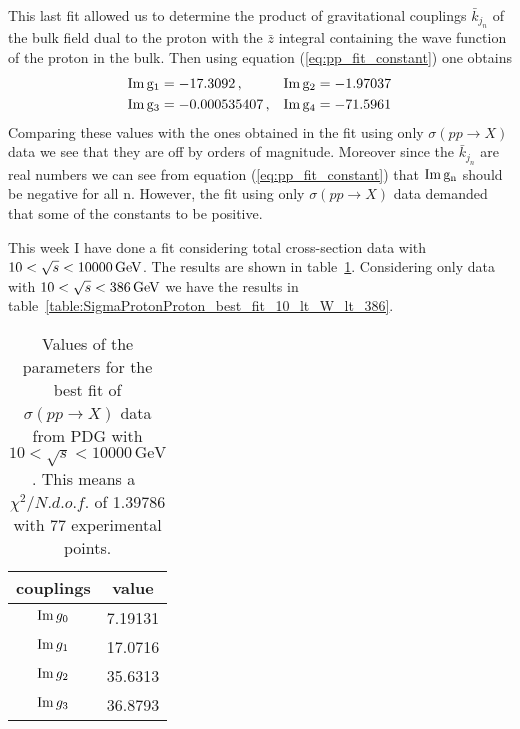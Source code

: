 \documentclass[preprint, 12pt]{elsarticle}
\begin{document}
This last fit allowed us to determine the product of gravitational couplings $\bar{k}_{j_n}$ of the bulk field dual to the proton with the $\bar{z}$ integral containing the wave function of the proton in the bulk. Then using equation (\ref{eq:pp_fit_constant}) one obtains
\begin{align}
& {\rm Im \, g_1} = -17.3092 \, , & {\rm Im \, g_2} = -1.97037 \notag \\
& {\rm Im \, g_3} = -0.000535407 \, , & {\rm Im \, g_4} =	-71.5961
\end{align}
Comparing these values with the ones obtained in the fit using only $\sigma\left(p p \rightarrow X\right)$ data we see that they are off by orders of magnitude. Moreover since the $\bar{k}_{j_n}$ are real numbers we can see from equation (\ref{eq:pp_fit_constant}) that ${\rm Im \, g_n}$ should be negative for all n. However, the fit using only $\sigma\left(p p \rightarrow X\right)$ data demanded that some of the constants to be positive.

This week I have done a fit considering total cross-section data with $10 < \sqrt{s} < 10000 \, \rm{GeV}$. The results are shown in table~\ref{table:SigmaProtonProton_best_fit_10_lt_W_lt_10000}. Considering only data with $10 < \sqrt{s} < 386 \, \rm{GeV}$ we have the results in table~\ref{table:SigmaProtonProton_best_fit_10_lt_W_lt_386}.
\begin{table}[b!]
\centering
\caption{Values of the parameters for the best fit of  $\sigma\left(p p \rightarrow X\right)$ data from PDG with $10 < \sqrt{s} < 10000 \, \text{GeV}$. This means a~$\chi^2 / {N.d.o.f.}$ of 1.39786 with 77 experimental points.}
\vspace{0.5cm}
\begin{tabular}{|c|c|}
\hline
couplings   & value \\
\hline
${\rm Im} \, g_0$  & 7.19131 \\ 
\hline
${\rm Im} \, g_1$  & 17.0716 \\ 
\hline
${\rm Im} \, g_2$  & 35.6313 \\
\hline
${\rm Im} \, g_3$  & 36.8793 \\ 
\hline
\end{tabular}
\label{table:SigmaProtonProton_best_fit_10_lt_W_lt_10000}
\end{table}
\end{document}
